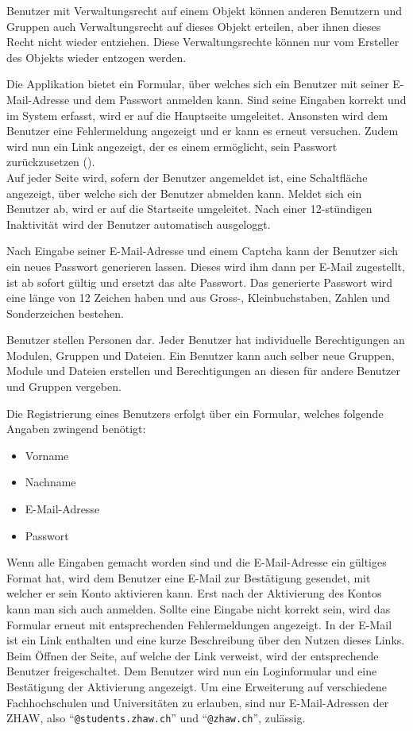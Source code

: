 Benutzer mit Verwaltungsrecht auf einem Objekt können anderen Benutzern und Gruppen auch Verwaltungsrecht auf dieses Objekt erteilen, aber ihnen dieses Recht nicht wieder entziehen. Diese Verwaltungsrechte können nur vom Ersteller des Objekts wieder entzogen werden.


Die Applikation bietet ein Formular, über welches sich ein Benutzer mit seiner E-Mail-Adresse und dem Passwort anmelden kann. Sind seine Eingaben korrekt und im System erfasst, wird er auf die Hauptseite umgeleitet. Ansonsten  wird dem Benutzer eine Fehlermeldung angezeigt und er kann es erneut versuchen. Zudem wird nun ein Link angezeigt, der es einem ermöglicht, sein Passwort zurückzusetzen ().\\

Auf jeder Seite wird, sofern der Benutzer angemeldet ist, eine Schaltfläche angezeigt, über welche sich der Benutzer abmelden kann. Meldet sich ein Benutzer ab, wird er auf die Startseite umgeleitet. Nach einer 12-stündigen Inaktivität wird der Benutzer automatisch ausgeloggt.

Nach Eingabe seiner E-Mail-Adresse und einem \gls{Captcha} kann der Benutzer sich ein neues Passwort generieren lassen. Dieses wird ihm dann per E-Mail zugestellt, ist ab sofort gültig und ersetzt das alte Passwort. Das generierte Passwort wird eine länge von 12 Zeichen haben und aus Gross-, Kleinbuchstaben, Zahlen und Sonderzeichen bestehen. 

Benutzer stellen Personen dar. Jeder Benutzer hat individuelle Berechtigungen an Modulen, Gruppen und Dateien. Ein Benutzer kann auch selber neue Gruppen, Module und Dateien erstellen und Berechtigungen an diesen für andere Benutzer und Gruppen vergeben.

Die Registrierung eines Benutzers erfolgt über ein Formular, welches folgende Angaben zwingend benötigt:
\begin{itemize}
\item Vorname
\item Nachname
\item E-Mail-Adresse
\item Passwort
\end{itemize}
Wenn alle Eingaben gemacht worden sind und die E-Mail-Adresse ein gültiges Format hat, wird dem Benutzer eine E-Mail zur Bestätigung gesendet, mit welcher er sein Konto aktivieren kann. Erst nach der Aktivierung des Kontos kann man sich auch anmelden. Sollte eine Eingabe nicht korrekt sein, wird das Formular erneut mit entsprechenden Fehlermeldungen angezeigt. In der E-Mail ist ein Link enthalten und eine kurze Beschreibung über den Nutzen dieses Links. Beim Öffnen der Seite, auf welche der Link verweist, wird der entsprechende Benutzer freigeschaltet. Dem Benutzer wird nun ein Loginformular und eine Bestätigung der Aktivierung angezeigt.
Um eine Erweiterung auf verschiedene Fachhochschulen und Universitäten zu erlauben, sind nur E-Mail-Adressen der ZHAW, also "`\texttt{@students.zhaw.ch}"' und "`\texttt{@zhaw.ch}"', zulässig.

